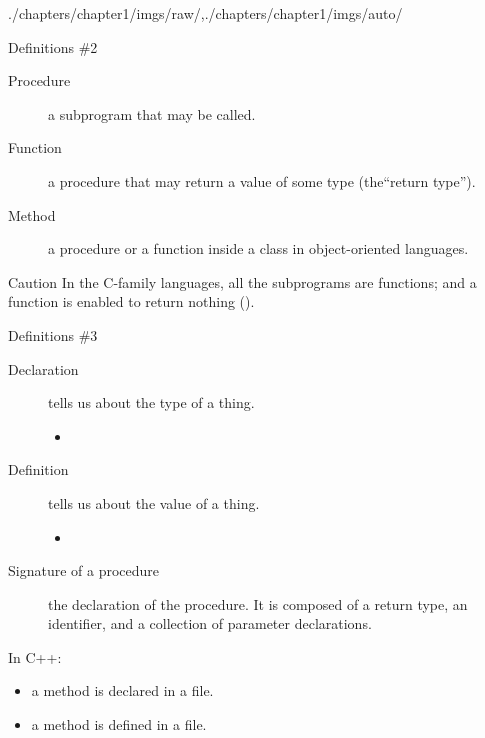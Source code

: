 \begin{graphicspathcontext}{{./chapters/chapter1/imgs/raw/},{./chapters/chapter1/imgs/auto/}}
\begin{bibunit}[apalike]
\begin{frame}{Definitions \#2}
	\begin{description}
	\item[Procedure] a subprogram that may be called.
	\item[Function] a procedure that may return a value of some type (the``return type'').
	\item[Method] a procedure or a function inside a class in object-oriented languages.
	\end{description}
	\begin{alertblock}{Caution}
	In the C-family languages, all the subprograms are functions; and a function is enabled to return nothing ().
	\end{alertblock}
\end{frame}

\begin{frame}{Definitions \#3}
	\begin{description}
	\item[Declaration] tells us about the type of a thing. \begin{itemize}
		\item {}
		\end{itemize}
	\item[Definition] tells us about the value of a thing. \begin{itemize}
		\item {}
		\end{itemize}
	\item[Signature of a procedure] the declaration of the procedure. It is composed of a return type, an identifier, and a collection of parameter declarations.
	\end{description}
	\begin{example}\smaller In C++: \begin{itemize}
		\item a method is declared in a  file.
		\item a method is defined in a  file.
		\end{itemize}
	\end{example}
\end{frame}


\end{bibunit}
\end{graphicspathcontext}
